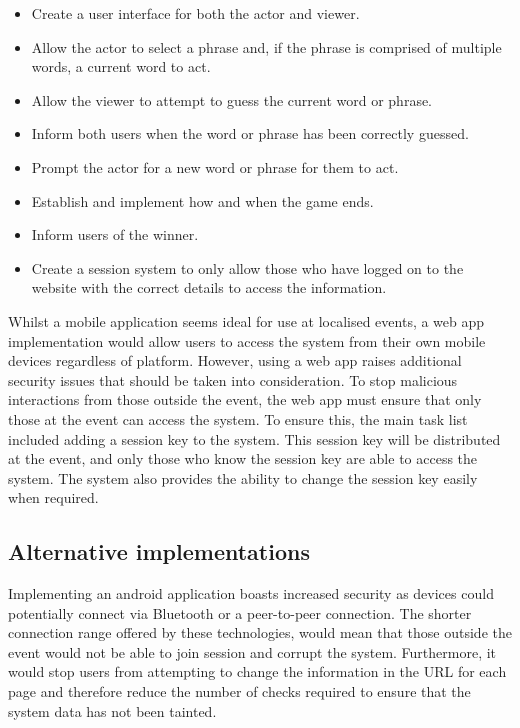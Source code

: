\begin{itemize}
	\item Create a user interface for both the actor and viewer.

	\item Allow the actor to select a phrase and, if the phrase is comprised of multiple words, a current word to act.

	\item Allow the viewer to attempt to guess the current word or phrase.

	\item Inform both users when the word or phrase has been correctly guessed.

	\item Prompt the actor for a new word or phrase for them to act.

	\item Establish and implement how and when the game ends.

	\item Inform users of the winner.

	\item Create a session system to only allow those who have logged on to the website with the correct details to access the information.

\end{itemize}

Whilst a mobile application seems ideal for use at localised events, a web app implementation would allow users to access the system from their own mobile devices regardless of platform. However, using a web app raises additional security issues that should be taken into consideration. To stop malicious interactions from those outside the event, the web app must ensure that only those at the event can access the system. To ensure this, the main task list included adding a session key to the system. This session key will be distributed at the event, and only those who know the session key are able to access the system. The system also provides the ability to change the session key easily when required.

\subsection{Alternative implementations}
Implementing an android application boasts increased security as devices could potentially connect via Bluetooth or a peer-to-peer connection. The shorter connection range offered by these technologies, would mean that those outside the event would not be able to join session and corrupt the system. Furthermore, it would stop users from attempting to change the information in the URL for each page and therefore reduce the number of checks required to ensure that the system data has not been tainted.

